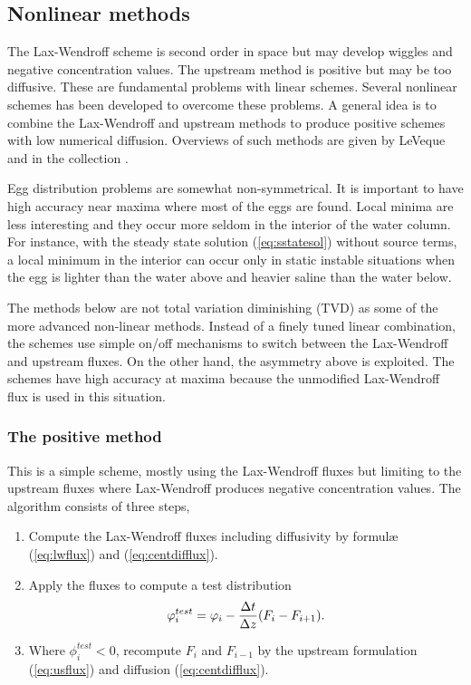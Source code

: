 \subsection{Nonlinear methods}\label{sec:nonlin}

The Lax-Wendroff scheme is second order in space but may develop
wiggles and negative concentration values. The upstream method is
positive but may be too diffusive. These are fundamental problems with
linear schemes.  Several nonlinear schemes has been developed to
overcome these problems.  A general idea is to combine the
Lax-Wendroff and upstream methods to produce positive schemes with low
numerical diffusion. Overviews of such methods are given by LeVeque
 and in the collection \citep{vreu93}.

Egg distribution problems are somewhat non-symmetrical. It is
important to have high accuracy near maxima where most of the eggs are
found. Local minima are less interesting and they occur more seldom in
the interior of the water column. For instance, with the steady state
solution (\ref{eq:sstatesol}) without source terms, a local minimum in
the interior can occur only in static instable situations when the egg
is lighter than the water above and heavier saline than the water
below.

The methods below are not total variation diminishing (TVD) as some of
the more advanced non-linear methods.  Instead of a finely tuned
linear combination, the schemes use simple on/off mechanisms to switch
between the Lax-Wendroff and upstream fluxes.  On the other hand, the
asymmetry above is exploited. The schemes have high accuracy at maxima
because the unmodified Lax-Wendroff flux is used in this situation.



\subsubsection{The positive method}

This is a simple scheme, mostly using the Lax-Wendroff
fluxes but limiting to the upstream fluxes where Lax-Wendroff produces
negative concentration values. The algorithm consists of three steps,
\begin{enumerate}
\item Compute the Lax-Wendroff fluxes including diffusivity by
   formul{\ae} (\ref{eq:lwflux}) and (\ref{eq:centdifflux}).
\item Apply the fluxes to compute a test distribution
\begin{displaymath}
  \varphi_i^{test} = \varphi_i - \frac{\Delta t}{\Delta z}(F_i - F_{i+1}) .
\end{displaymath}
\item Where $\phi_i^{test} < 0$, recompute $F_i$ and $F_{i-1}$ by the
  upstream formulation (\ref{eq:usflux}) and diffusion (\ref{eq:centdifflux}).
\end{enumerate}


